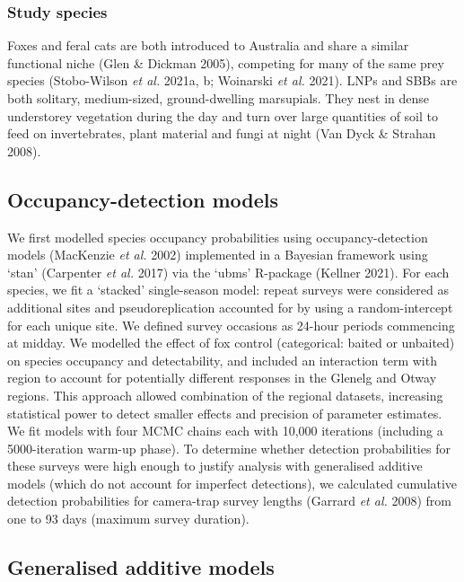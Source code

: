 \documentclass[11pt,a4paper,titlepage,twoside,openright]{style/unimelbthesis}
\begin{document}
\begin{mainmatter}
{\subsubsection{Study species}\label{study-species-1}}

Foxes and feral cats are both introduced to Australia and share a similar functional niche (Glen \& Dickman 2005), competing for many of the same prey species (Stobo-Wilson \emph{et al.} 2021a, b; Woinarski \emph{et al.} 2021). LNPs and SBBs are both solitary, medium-sized, ground-dwelling marsupials. They nest in dense understorey vegetation during the day and turn over large quantities of soil to feed on invertebrates, plant material and fungi at night (Van Dyck \& Strahan 2008).

\hypertarget{occupancy-detection-models}{%
\subsection{Occupancy-detection models}\label{occupancy-detection-models}}

We first modelled species occupancy probabilities using occupancy-detection models (MacKenzie \emph{et al.} 2002) implemented in a Bayesian framework using `stan' (Carpenter \emph{et al.} 2017) via the `ubms' R-package (Kellner 2021). For each species, we fit a `stacked' single-season model: repeat surveys were considered as additional sites and pseudoreplication accounted for by using a random-intercept for each unique site. We defined survey occasions as 24-hour periods commencing at midday. We modelled the effect of fox control (categorical: baited or unbaited) on species occupancy and detectability, and included an interaction term with region to account for potentially different responses in the Glenelg and Otway regions. This approach allowed combination of the regional datasets, increasing statistical power to detect smaller effects and precision of parameter estimates. We fit models with four MCMC chains each with 10,000 iterations (including a 5000-iteration warm-up phase). To determine whether detection probabilities for these surveys were high enough to justify analysis with generalised additive models (which do not account for imperfect detections), we calculated cumulative detection probabilities for camera-trap survey lengths (Garrard \emph{et al.} 2008) from one to 93 days (maximum survey duration).

\hypertarget{generalised-additive-models}{%
\subsection{Generalised additive models}\label{generalised-additive-models}}


\end{mainmatter}
\end{document}
